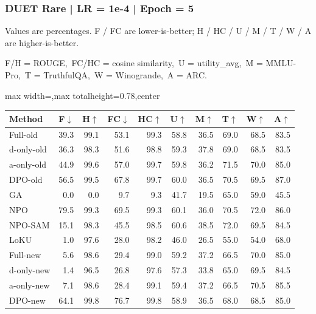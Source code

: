 \documentclass[aspectratio=169,11pt]{beamer}
\begin{document}
\begin{frame}[t]
\frametitle{DUET Rare | LR = 1e-4 | Epoch = 5}
{\tiny Values are percentages. F / FC are lower-is-better; H / HC / U / M / T / W / A are higher-is-better.}

{\tiny F/H = ROUGE,\ FC/HC = cosine similarity,\ U = utility\_avg,\ M = MMLU-Pro,\ T = TruthfulQA,\ W = Winogrande,\ A = ARC.}

\vspace{0.35em}
\centering
\scriptsize
\setlength{\tabcolsep}{3.6pt}
\renewcommand{\arraystretch}{1.05}
\begin{adjustbox}{max width=\textwidth,max totalheight=0.78\textheight,center}
\begin{tabular}{l*{9}{r}}
\toprule
Method & F$\downarrow$ & H$\uparrow$ & FC$\downarrow$ & HC$\uparrow$ & U$\uparrow$ & M$\uparrow$ & T$\uparrow$ & W$\uparrow$ & A$\uparrow$ \\
\midrule
\rowcolor{blue!10}
Full-old & 39.3 & 99.1 & 53.1 & 99.3 & 58.8 & 36.5 & 69.0 & 68.5 & 83.5 \\
\rowcolor{orange!10}
d-only-old & 36.3 & 98.3 & 51.6 & 98.8 & 59.3 & 37.8 & 69.0 & 68.5 & 83.5 \\
\rowcolor{green!10}
a-only-old & 44.9 & 99.6 & 57.0 & 99.7 & 59.8 & 36.2 & 71.5 & 70.0 & 85.0 \\
\rowcolor{gray!8}
DPO-old & 56.5 & 99.5 & 67.8 & 99.7 & 60.0 & 36.5 & 70.5 & 69.5 & 87.0 \\
\rowcolor{gray!8}
GA & 0.0 & 0.0 & 9.7 & 9.3 & 41.7 & 19.5 & 65.0 & 59.0 & 45.5 \\
\rowcolor{gray!8}
NPO & 79.5 & 99.3 & 69.5 & 99.3 & 60.1 & 36.0 & 70.5 & 72.0 & 86.0 \\
\rowcolor{gray!8}
NPO-SAM & 15.1 & 98.3 & 45.5 & 98.5 & 60.6 & 38.5 & 72.0 & 69.5 & 84.5 \\
\rowcolor{gray!8}
LoKU & 1.0 & 97.6 & 28.0 & 98.2 & 46.0 & 26.5 & 55.0 & 54.0 & 68.0 \\
\rowcolor{blue!20}
Full-new & 5.6 & 98.6 & 29.4 & 99.0 & 59.2 & 37.2 & 66.5 & 70.0 & 85.0 \\
\rowcolor{orange!20}
d-only-new & 1.4 & 96.5 & 26.8 & 97.6 & 57.3 & 33.8 & 65.0 & 69.5 & 84.5 \\
\rowcolor{green!20}
a-only-new & 7.1 & 98.6 & 28.4 & 99.1 & 59.4 & 37.2 & 66.5 & 70.5 & 85.5 \\
\rowcolor{gray!15}
DPO-new & 64.1 & 99.8 & 76.7 & 99.8 & 58.9 & 36.5 & 68.0 & 68.5 & 85.0 \\
\bottomrule
\end{tabular}
\end{adjustbox}
\end{frame}
\end{document}
